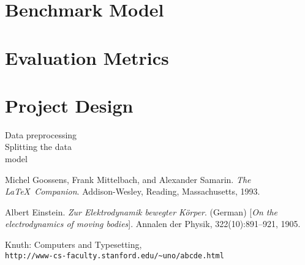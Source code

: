 \documentclass[10pt,a4paper]{article}
\begin{document}


\section{Benchmark Model}


\section{Evaluation Metrics}




\section{Project Design}


Data preprocessing\\
Splitting the data\\
model



\begin{thebibliography}{9}
Michel Goossens, Frank Mittelbach, and Alexander Samarin. 
\textit{The \LaTeX\ Companion}. 
Addison-Wesley, Reading, Massachusetts, 1993.
 
Albert Einstein. 
\textit{Zur Elektrodynamik bewegter K{\"o}rper}. (German) 
[\textit{On the electrodynamics of moving bodies}]. 
Annalen der Physik, 322(10):891–921, 1905.
 
Knuth: Computers and Typesetting,
\\\texttt{http://www-cs-faculty.stanford.edu/\~{}uno/abcde.html}
\end{thebibliography}
\end{document}
